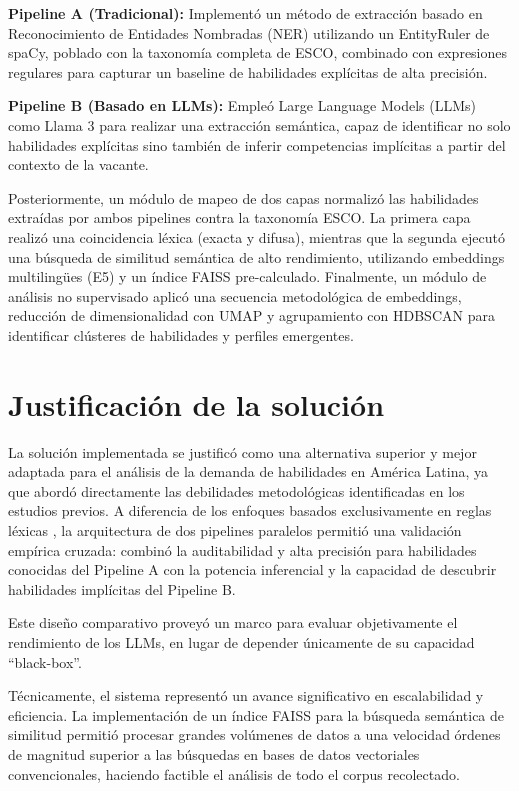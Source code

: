 \textbf{Pipeline A (Tradicional):} Implementó un método de extracción basado en Reconocimiento de Entidades Nombradas (NER) utilizando un EntityRuler de spaCy, poblado con la taxonomía completa de ESCO, combinado con expresiones regulares para capturar un baseline de habilidades explícitas de alta precisión.

\textbf{Pipeline B (Basado en LLMs):} Empleó Large Language Models (LLMs) como Llama 3 para realizar una extracción semántica, capaz de identificar no solo habilidades explícitas sino también de inferir competencias implícitas a partir del contexto de la vacante.

Posteriormente, un módulo de mapeo de dos capas normalizó las habilidades extraídas por ambos pipelines contra la taxonomía ESCO. La primera capa realizó una coincidencia léxica (exacta y difusa), mientras que la segunda ejecutó una búsqueda de similitud semántica de alto rendimiento, utilizando embeddings multilingües (E5) y un índice FAISS pre-calculado. Finalmente, un módulo de análisis no supervisado aplicó una secuencia metodológica de embeddings, reducción de dimensionalidad con UMAP y agrupamiento con HDBSCAN para identificar clústeres de habilidades y perfiles emergentes.

\section{Justificación de la solución}

La solución implementada se justificó como una alternativa superior y mejor adaptada para el análisis de la demanda de habilidades en América Latina, ya que abordó directamente las debilidades metodológicas identificadas en los estudios previos. A diferencia de los enfoques basados exclusivamente en reglas léxicas \parencite{aguilera2018, rubio2024}, la arquitectura de dos pipelines paralelos permitió una validación empírica cruzada: combinó la auditabilidad y alta precisión para habilidades conocidas del Pipeline A con la potencia inferencial y la capacidad de descubrir habilidades implícitas del Pipeline B.

Este diseño comparativo proveyó un marco para evaluar objetivamente el rendimiento de los LLMs, en lugar de depender únicamente de su capacidad ``black-box''.

Técnicamente, el sistema representó un avance significativo en escalabilidad y eficiencia. La implementación de un índice FAISS para la búsqueda semántica de similitud permitió procesar grandes volúmenes de datos a una velocidad órdenes de magnitud superior a las búsquedas en bases de datos vectoriales convencionales, haciendo factible el análisis de todo el corpus recolectado.

